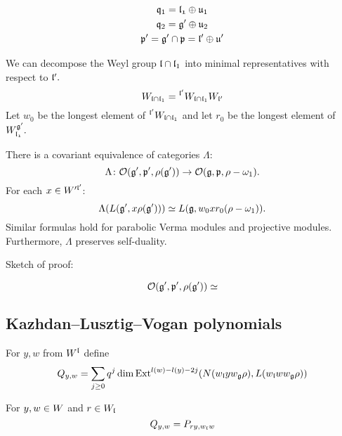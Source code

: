 \documentclass[a4paper,10pt]{article}
\begin{document}
\medskip

\begin{gather*}
\mathfrak{q}_1 = \mathfrak{l_1} \oplus \mathfrak{u}_{1} \\
\mathfrak{q}_2 = \mathfrak{g}' \oplus \mathfrak{u}_{2} \\
\mathfrak{p}' = \mathfrak{g}' \cap \mathfrak{p} = \mathfrak{l}' \oplus \mathfrak{u}'
\end{gather*}

We can decompose the Weyl group $\mathfrak{l} \cap \mathfrak{l}_1$ into minimal representatives with respect to $\mathfrak{l}'.$
\[
 W_{\mathfrak{l}\cap\mathfrak{l}_1} = {}^{\mathfrak{l}'} W_{\mathfrak{l}\cap\mathfrak{l}_1} W_{\mathfrak{l'}}
\]
Let $w_0$ be the longest element of $ {}^{\mathfrak{l}'} W_{\mathfrak{l}\cap\mathfrak{l}_1}$ and let $r_0$ be the longest element of $W^{\mathfrak{g'}}_{\mathfrak{l_1}}.$

\begin{proposition}
	There is a covariant equivalence of categories $\Lambda$:
	\[
		\Lambda \colon \mathcal{O}(\mathfrak{g}', \mathfrak{p}', \rho(\mathfrak{g}')) \to \mathcal{O}(\mathfrak{g}, \mathfrak{p}, \rho - \omega_1).
	\]
	For each $x \in W'^{\mathfrak{l}'}$:
	\[
		\Lambda(L(\mathfrak{g}', x\rho(\mathfrak{g}'))) \simeq L(\mathfrak{g}, w_0 x r_0 (\rho - \omega_1)). 
	\]
	Similar formulas hold for parabolic Verma modules and projective modules. Furthermore, $\Lambda$ preserves self-duality.
\end{proposition}

\noindent Sketch of proof:

\[
 \mathcal{O}(\mathfrak{g}', \mathfrak{p}', \rho(\mathfrak{g}')) \simeq 
\]


\subsection{Kazhdan--Lusztig--Vogan polynomials}

For $y, w$ from $W^{\mathfrak{l}}$ define
\[
Q_{y, w} = \sum_{j\geq 0} q^j \dim \mathrm{Ext}^{l(w) - l(y) -2j} (N(w_{\mathfrak{l}} y w_{\mathfrak{g}}\rho), L(w_{\mathfrak{l}} w w_{\mathfrak{g}}\rho))
\]

\begin{lemma} For $y, w \in W^{\mathfrak{}}$ and $r\in W_{\mathfrak{l}}$
	\[
		Q_{y,w}  = P_{ry, w_{\mathfrak{l}} w}
	\]
\end{lemma}
	
\end{document}
